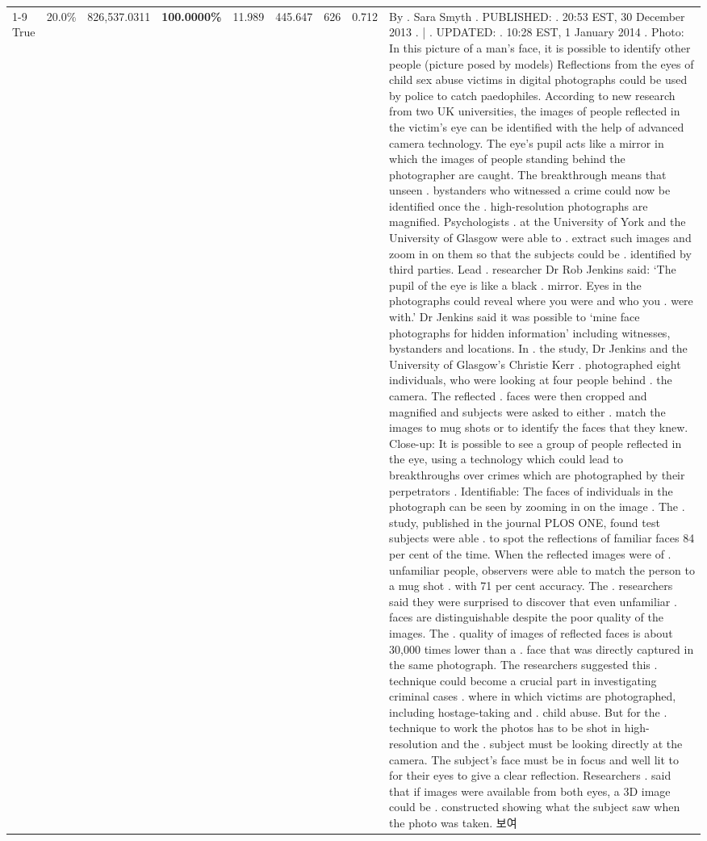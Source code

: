 \begin{table}[H]
\begin{tabular}{lllrlllll}
\cline{1-9}
True & 20.0\% & 826,537.0311 & \bfseries \color{red} 100.0000\% & 11.989 & 445.647 & 626 & 0.712 & By . Sara Smyth . PUBLISHED: . 20:53 EST, 30 December 2013 . | . UPDATED: . 10:28 EST, 1 January 2014 . Photo: In this picture of a man's face, it is possible to identify other people (picture posed by models) Reflections from the eyes of child sex abuse victims in digital photographs could be used by police to catch paedophiles. According to new research from two UK universities, the images of people reflected in the victim's eye can be identified with the help of advanced camera technology. The eye's pupil acts like a mirror in which the images of people standing behind the photographer are caught. The breakthrough means that unseen . bystanders who witnessed a crime could now be identified once the . high-resolution photographs are magnified. Psychologists . at the University of York and the University of Glasgow were able to . extract such images and zoom in on them so that the subjects could be . identified by third parties. Lead . researcher Dr Rob Jenkins said: ‘The pupil of the eye is like a black . mirror. Eyes in the photographs could reveal where you were and who you . were with.' Dr Jenkins said it was possible to ‘mine face photographs for hidden information' including witnesses, bystanders and locations. In . the study, Dr Jenkins and the University of Glasgow's Christie Kerr . photographed eight individuals, who were looking at four people behind . the camera. The reflected . faces were then cropped and magnified and subjects were asked to either . match the images to mug shots or to identify the faces that they knew. Close-up: It is possible to see a group of people reflected in the eye, using a technology which could lead to breakthroughs over crimes which are photographed by their perpetrators . Identifiable: The faces of individuals in the photograph can be seen by zooming in on the image . The . study, published in the journal PLOS ONE, found test subjects were able . to spot the reflections of familiar faces 84 per cent of the time. When the reflected images were of . unfamiliar people, observers were able to match the person to a mug shot . with 71 per cent accuracy. The . researchers said they were surprised to discover that even unfamiliar . faces are distinguishable despite the poor quality of the images. The . quality of images of reflected faces is about 30,000 times lower than a . face that was directly captured in the same photograph. The researchers suggested this . technique could become a crucial part in investigating criminal cases . where in which victims are photographed, including hostage-taking and . child abuse. But for the . technique to work the photos has to be shot in high-resolution and the . subject must be looking directly at the camera. The subject's face must be in focus and well lit to for their eyes to give a clear reflection. Researchers . said that if images were available from both eyes, a 3D image could be . constructed showing what the subject saw when the photo was taken. 보여 \\

\end{tabular}
\end{table}
